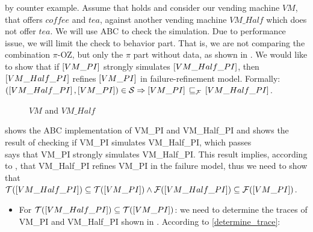 \begin{prf}
by counter example. Assume that  holds and consider our vending machine $VM$, that offers $coffee$ and $tea$, against another vending machine $VM\_Half$ which does not offer $tea$. We will use ABC to check the simulation. Due to performance issue, we will limit the check to behavior part. That is, we are not comparing the combination $\pi$-OZ, but only the $\pi$ part   without data, as shown in . We would like to show that if $\left[VM\_PI\right]$ strongly simulates $\left[VM\_Half\_PI\right]$, then $\left[VM\_Half\_PI\right]$ refines $\left[VM\_PI\right]$ in failure-refinement model. Formally: $(\ec{VM\_Half\_PI},\ec{VM\_PI})\in{}\simu  \Rightarrow \ec{VM\_PI} \refiF \ec{VM\_Half\_PI}$.
\begin{figure}[H]%
\centering
{}%
\qquad
{}%
\caption{$VM$ and $VM\_Half$}
\label{vm_and_vmHalf}
\end{figure}

 shows the ABC implementation of VM\_PI and VM\_Half\_PI and  shows the result of checking if VM\_PI simulates VM\_Half\_PI, which passes\\






 says that VM\_PI strongly simulates VM\_Half\_PI. This result implies, according to , that VM\_Half\_PI refines VM\_PI in the failure model, thus we need to show that $\traces[VM\_Half\_PI]\subseteq\traces[VM\_PI] \wedge \failures[VM\_Half\_PI]\subseteq\failures[VM\_PI]$.
\begin{itemize}
\item For $\traces[VM\_Half\_PI]\subseteq\traces[VM\_PI]$: we need to determine the traces of VM\_PI and VM\_Half\_PI  shown in . According to \ref{determine_trace}:


\end{itemize}
\end{prf}
